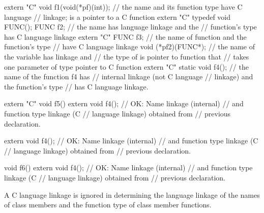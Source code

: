 \begin{example}

\begin{codeblock}
extern "C" void f1(void(*pf)(int));
                                // the name  and its function type have C language
                                // linkage;  is a pointer to a C function
extern "C" typedef void FUNC();
FUNC f2;                        // the name  has \Cpp language linkage and the
                                // function's type has C language linkage
extern "C" FUNC f3;             // the name of function  and the function's type
                                // have C language linkage
void (*pf2)(FUNC*);             // the name of the variable  has \Cpp linkage and
                                // the type of  is pointer to \Cpp function that
                                // takes one parameter of type pointer to C function
extern "C" {
  static void f4();             // the name of the function f4 has
                                // internal linkage (not C language
                                // linkage) and the function's type
                                // has C language linkage.
}

extern "C" void f5() {
  extern void f4();             // OK: Name linkage (internal)
                                // and function type linkage (C
                                // language linkage) obtained from
                                // previous declaration.
}

extern void f4();               // OK: Name linkage (internal)
                                // and function type linkage (C
                                // language linkage) obtained from
                                // previous declaration.

void f6() {
  extern void f4();             // OK: Name linkage (internal)
                                // and function type linkage (C
                                // language linkage) obtained from
                                // previous declaration.
}
\end{codeblock}
\end{example}
%
A C language linkage is ignored
in determining the language linkage of
the names of class members and the
function type of class member functions.
